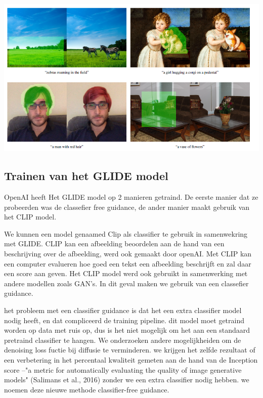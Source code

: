 \documentclass[12pt]{article}
\begin{document}
\begin{center}
    \includegraphics[width=1\columnwidth]{GLIDE2.png}
\end{center}


\subsection{Trainen van het GLIDE model}
OpenAI heeft Het GLIDE model op 2 manieren getraind. De eerste manier dat ze probeerden was de classefier
free guidance, de ander manier maakt gebruik van het CLIP model.

\bigskip
We kunnen een model genaamed Clip als classifier te gebruik in samenwekring met GLIDE.
CLIP kan een afbeelding beoordelen aan de hand van een beschrijving over de afbeelding,
werd ook gemaakt door openAI. Met CLIP kan een computer evalueren hoe goed een tekst een afbeelding beschrijft
en zal daar een score aan geven. Het CLIP model werd ook gebruikt in samenwerking met andere modellen zoals GAN’s.
In dit geval maken we gebruik van een classefier guidance. 
\Autocite{Radford2021} 

\bigskip
het probleem met een classifier guidance is dat het een extra classifier model nodig heeft, en dat compliceerd
de training pipeline. dit model moet getraind worden op data met ruis op, dus is het niet mogelijk om het aan een standaard pretraind classifier te hangen.
We onderzoeken andere mogelijkheiden om de denoising loss fuctie bij diffusie te verminderen.
we krijgen het zelfde rezultaat of een verbetering in het
percentaal kwaliteit gemeten aan de hand van de
Inception score --"a metric for automatically evaluating the quality of image generative models" (Salimans et al., 2016)
zonder we een extra classifier nodig hebben. we noemen deze nieuwe methode classifier-free guidance.
\autocite{Ho2021}
\end{document}
